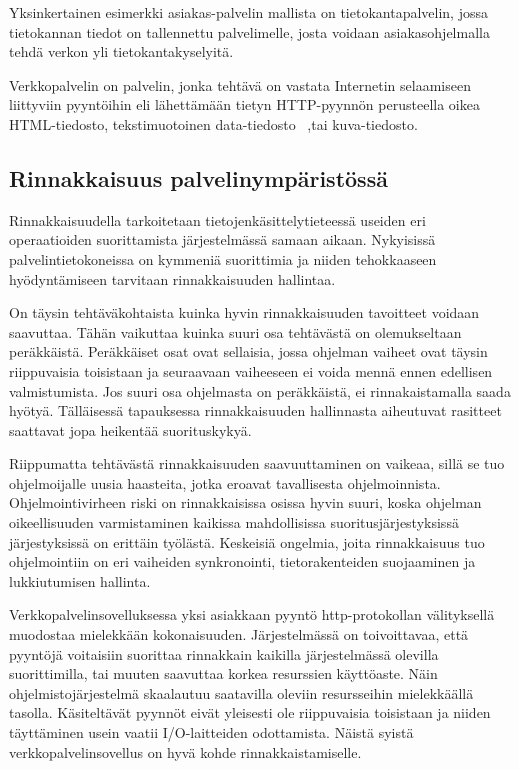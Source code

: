 \documentclass[12pt]{article}
\begin{document}
Yksinkertainen esimerkki asiakas-palvelin mallista on tietokantapalvelin,
jossa tietokannan tiedot on tallennettu palvelimelle, josta voidaan
asiakasohjelmalla tehdä verkon yli tietokantakyselyitä.

Verkkopalvelin on palvelin, jonka tehtävä on vastata Internetin
selaamiseen liittyviin pyyntöihin eli lähettämään tietyn HTTP-pyynnön
perusteella oikea HTML-tiedosto, tekstimuotoinen data-tiedosto~\cite{Berners-Lee_1994}
,tai kuva-tiedosto.
\subsection{Rinnakkaisuus palvelinympäristössä}

Rinnakkaisuudella tarkoitetaan tietojenkäsittelytieteessä useiden
eri operaatioiden suorittamista järjestelmässä samaan aikaan.
Nykyisissä palvelintietokoneissa on kymmeniä suorittimia ja niiden tehokkaaseen
hyödyntämiseen tarvitaan rinnakkaisuuden hallintaa.

On täysin tehtäväkohtaista
kuinka hyvin rinnakkaisuuden tavoitteet voidaan saavuttaa.
Tähän vaikuttaa kuinka suuri osa tehtävästä on olemukseltaan peräkkäistä.
Peräkkäiset osat ovat sellaisia, jossa ohjelman vaiheet ovat täysin
riippuvaisia toisistaan ja seuraavaan vaiheeseen ei voida mennä ennen edellisen
valmistumista. Jos suuri osa ohjelmasta on peräkkäistä, ei rinnakaistamalla
saada hyötyä. Tälläisessä tapauksessa rinnakkaisuuden hallinnasta aiheutuvat
rasitteet saattavat jopa heikentää suorituskykyä.

Riippumatta tehtävästä rinnakkaisuuden saavuuttaminen on vaikeaa,
sillä se tuo ohjelmoijalle uusia haasteita, jotka eroavat tavallisesta
ohjelmoinnista. Ohjelmointivirheen riski on rinnakkaisissa osissa hyvin suuri,
koska ohjelman oikeellisuuden varmistaminen kaikissa mahdollisissa
suoritusjärjestyksissä järjestyksissä on erittäin työlästä.
Keskeisiä ongelmia, joita rinnakkaisuus tuo ohjelmointiin on eri vaiheiden
synkronointi, tietorakenteiden suojaaminen ja lukkiutumisen hallinta.

Verkkopalvelinsovelluksessa yksi asiakkaan pyyntö http-protokollan välityksellä
muodostaa mielekkään kokonaisuuden.
Järjestelmässä on toivoittavaa, että pyyntöjä voitaisiin suorittaa
rinnakkain kaikilla järjestelmässä olevilla suorittimilla, tai muuten 
saavuttaa korkea resurssien käyttöaste.
Näin ohjelmistojärjestelmä skaalautuu saatavilla oleviin resursseihin
mielekkäällä tasolla. Käsiteltävät pyynnöt eivät yleisesti ole riippuvaisia
toisistaan ja niiden täyttäminen usein vaatii I/O-laitteiden odottamista.
Näistä syistä verkkopalvelinsovellus on hyvä kohde rinnakkaistamiselle.
\end{document}
